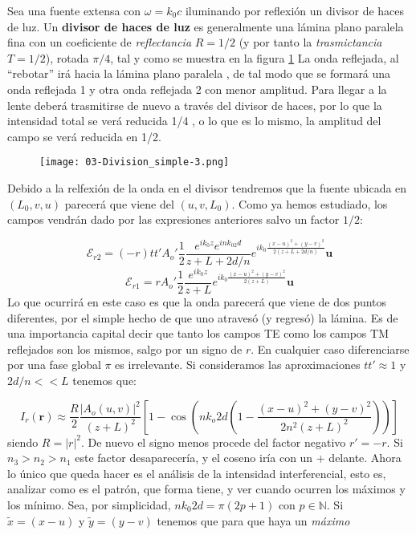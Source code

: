 \documentclass[12pt,a4paper]{book}
\numberwithin{equation}{section}
\numberwithin{figure}{section}
\newcommand{\parentesis}[1]{\left( #1  \right)}
\newcommand{\ccorchetes}[1]{\left[ #1  \right]}
\newcommand{\1}{_{(1)}}
\newcommand{\2}{_{(2)}}
\newcommand{\un}{\mathbf{u}}
\newcommand{\rn}{\mathbf{r}}
\newcommand{\Encal}{\boldsymbol{\mathcal{E}}}
\theoremstyle{definition}
\begin{document}
Sea una fuente extensa con $\omega=k_0 c$ iluminando por reflexión un divisor de haces de luz. Un \textbf{divisor de haces de luz} es generalmente una lámina plano paralela fina con un coeficiente de \textit{reflectancia} $R=1/2$ (y por tanto la \textit{trasmictancia} $T=1/2$), rotada $\pi/4$, tal y como se muestra en la figura \ref{Fig:03.1-03} La onda reflejada, al ``rebotar'' irá hacia la lámina plano paralela , de tal modo que se formará una onda reflejada 1 y otra onda reflejada 2 con menor amplitud. Para llegar a la lente deberá trasmitirse de nuevo a través del divisor de haces, por lo que la intensidad total se verá reducida 1/4 , o lo que es lo mismo, la amplitud del campo se verá reducida en 1/2. 

\begin{figure}[h!] \centering
\texttt{[image: 03-Division\_simple-3.png]}
\caption{}
\label{Fig:03.1-03}
\end{figure}

Debido a la relfexión de la onda en el divisor tendremos que la fuente ubicada en $(L_0,v,u)$ parecerá que viene del $(u,v,L_0)$. Como ya hemos estudiado, los campos vendrán dado por las expresiones anteriores salvo un factor $1/2 $:

\begin{equation}
\Encal_{r2} = (-r)tt' A_o' \frac{1}{2} \frac{e^{ik_0z}e^{ink_02d}}{z+L+2d/n}  e^{ik_0\frac{(x-u)^2+(y-v)^2}{2(z+L+2d/n)}} \un
\end{equation}
\begin{equation}
\Encal_{r1} = rA_o'  \frac{1}{2} \frac{e^{ik_0z}}{z+L} e^{i k_0 \frac{(x-u)^2+(y-v)^2}{2(z+L)}} \un
\end{equation}
Lo que ocurrirá en este caso es que la onda parecerá que viene de dos puntos diferentes, por el simple hecho de que uno atravesó (y regresó) la lámina. Es de una importancia capital decir que tanto los campos TE como los campos TM reflejados son los mismos, salgo por un signo de $r$. En cualquier caso diferenciarse por una fase global $\pi$ es irrelevante. Si consideramos las aproximaciones $tt' \approx 1$ y $2d/n <<L$ tenemos que:

\begin{equation}
I_r(\rn) \approx \frac{R}{2} \frac{|A_o (u,v)|^2}{(z+L)^2} \ccorchetes{1- \cos \parentesis{nk_o 2d \parentesis{1-\frac{(x-u)^2+(y-v)^2}{2n^2(z+L)^2}}}}
\end{equation}
siendo $R=|r|^2$. De nuevo el signo menos procede del factor negativo $r'=-r$. Si $n_3>n_2>n_1$ este factor desaparecería, y el coseno iría con un + delante. Ahora lo único que queda hacer es el análisis de la intensidad interferencial, esto es, analizar como es el patrón, que forma tiene, y ver cuando ocurren los máximos y los mínimo. Sea, por simplicidad, $nk_0 2 d=\pi(2p+1)$ con $p \in \mathbb{N}$. Si $\tilde{x}=(x-u)$ y $\tilde{y}=(y-v)$ tenemos que para que haya un \textit{máximo}
\end{document}

